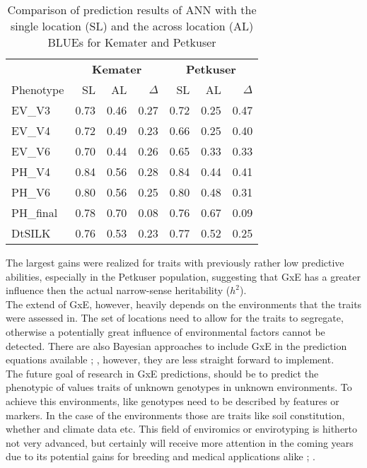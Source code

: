 \onehalfspacing
\begin{table}[H] 
 \centering
 \caption[Comparison of prediction results of ANN within locations and across locations
 for Kemater and Petkuser]{Comparison of prediction results of ANN with the single location (SL) 
   and the across location (AL) BLUEs for Kemater and Petkuser}
 \begin{tabular}{lrrr|rrr}
   \toprule
   & \multicolumn{3}{c}{\textbf{Kemater}} & \multicolumn{3}{c}{\textbf{Petkuser}}    \\
   Phenotype & SL                                   & AL   & $\Delta$ & SL   & AL   & $\Delta$ \\ 
   \midrule
   EV\_V3    & 0.73                                 & 0.46 & 0.27     & 0.72 & 0.25 & 0.47     \\ 
   EV\_V4    & 0.72                                 & 0.49 & 0.23     & 0.66 & 0.25 & 0.40     \\ 
   EV\_V6    & 0.70                                 & 0.44 & 0.26     & 0.65 & 0.33 & 0.33     \\ 
   PH\_V4    & 0.84                                 & 0.56 & 0.28     & 0.84 & 0.44 & 0.41     \\ 
   PH\_V6    & 0.80                                 & 0.56 & 0.25     & 0.80 & 0.48 & 0.31     \\ 
   PH\_final & 0.78                                 & 0.70 & 0.08     & 0.76 & 0.67 & 0.09     \\ 
   DtSILK    & 0.76                                 & 0.53 & 0.23     & 0.77 & 0.52 & 0.25     \\ 
   \bottomrule
 \end{tabular}
\label{tab:ge_deltas}
\end{table}
\doublespacing

The largest gains were realized for traits with previously rather low predictive
abilities, especially in the Petkuser population, suggesting that GxE has a greater
influence then the actual narrow-sense heritability ($h^2$). \\
The extend of GxE, however, heavily depends on the environments that the traits were
assessed in. The set of locations need to allow for the traits to segregate,
otherwise a potentially great influence of environmental factors cannot be detected. There
are also Bayesian approaches to include GxE in the prediction equations available
\cite{cuevas2017bayesian}; \cite{crossa2019deep}, however, they are less straight forward
to implement. \\
The future goal of research in GxE predictions, should be to predict the phenotypic of
values traits of unknown genotypes in unknown environments. To achieve this environments,
like genotypes need to be described by features or markers. In the case of the
environments those are traits like soil constitution, whether and climate data etc. This
field of enviromics or envirotyping is hitherto not very advanced, but certainly will
receive more attention in the coming years due to its potential gains for breeding and
medical applications alike \cite{resende2019enviromics}; \cite{chang2019envirotyping}.


